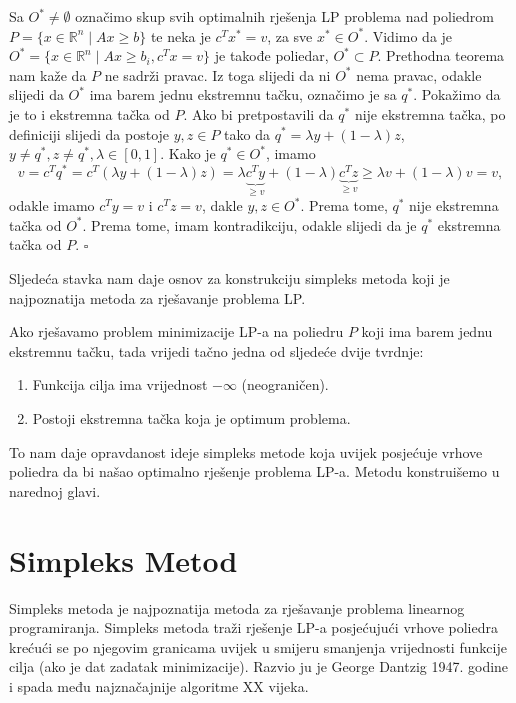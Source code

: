 \documentclass[a4paper, utf8, 11pt, colorlinks]{book}
\newtheorem{thm}{Teorema}
\newenvironment{proof}{{Dokaz:}}{\hfill$\square$}
\begin{document}
\begin{proof}
         Sa $O^* \not = \emptyset$ označimo skup svih optimalnih rješenja LP problema nad poliedrom $P= \{ x \in \mathbb{R}^n \mid A x \geq b \}$ te neka je $c^T x^* = v$, za sve $x^* \in O^*$. Vidimo da je 
         $O^* = \{ x \in \mathbb{R}^n \mid A x \geq b_i, c^T x = v  \}$ je takođe poliedar, $O^* \subset P$. Prethodna teorema nam kaže da $P$ ne sadrži pravac. Iz toga slijedi da ni $O^*$ nema pravac, odakle slijedi da $O^*$ ima barem jednu ekstremnu tačku, označimo je sa $q^*$. Pokažimo da je to i ekstremna tačka od $P$.  Ako bi pretpostavili da $q^*$ nije ekstremna tačka, po definiciji slijedi da postoje $y, z \in P$ tako da $q^* = \lambda y + ( 1 - \lambda ) z $, $y \neq q^*, z \neq q^*, \lambda \in [0, 1]$. Kako je $q^* \in O^*$, imamo 
         $$ v = c^T q^* = c^T (  \lambda y + ( 1 - \lambda ) z ) = \lambda 
        \underbrace{ c^T y}_{ \geq v} + ( 1 - \lambda ) \underbrace{c^T z}_{\geq v} \geq \lambda v + (1 - \lambda) v = v,$$
        odakle imamo $c^T y = v$ i $c^T z = v$, dakle $y, z \in O^*$. Prema tome, $q^*$ nije ekstremna tačka od $O^*$. Prema tome, imam kontradikciju, odakle slijedi da je $q^*$  ekstremna tačka od  $P$.
\end{proof}
 
 Sljedeća stavka nam daje osnov za konstrukciju simpleks metoda koji je najpoznatija metoda za rješavanje problema LP.
 
 Ako  rješavamo problem minimizacije LP-a na poliedru $P$ koji ima barem jednu ekstremnu tačku, tada vrijedi tačno jedna od sljedeće dvije tvrdnje:
   \begin{enumerate}
       \item Funkcija cilja ima vrijednost $- \infty$ (neograničen).
       \item Postoji ekstremna tačka koja je optimum problema. 
   \end{enumerate}
To nam daje opravdanost ideje simpleks metode koja uvijek posjećuje vrhove poliedra 
da bi našao optimalno rješenje problema LP-a. Metodu konstruišemo u narednoj glavi.

\newpage 
\chapter{Simpleks Metod}

Simpleks metoda je najpoznatija metoda za rješavanje problema linearnog programiranja. Simpleks metoda traži rješenje LP-a posjećujući vrhove poliedra krećući se po njegovim granicama  uvijek u smijeru smanjenja vrijednosti
funkcije cilja (ako je dat zadatak minimizacije). Razvio ju je George Dantzig 1947. godine i spada među najznačajnije algoritme XX vijeka.
\end{document}
